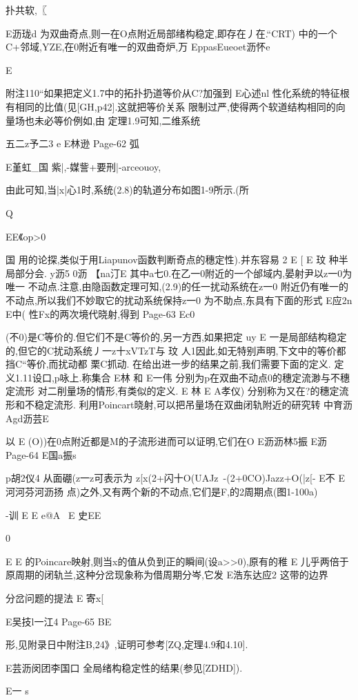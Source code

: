 {扑共软,〖

E沥珑d
为双曲奇点,则一在O点附近局部绪构稳定,即存在丿在.“CRT)
中的一个C+邻域,YZE,在0附近有唯一的双曲奇炉,万
EppasEueoet沥怀e

E

附注110“如果把定义1.7中的拓扑扔道等价从C?加强到
E心述nl
性化系统的特征根有相同的比值(见[GH,p42].这就把等价关系
限制过严,使得两个软道结构相同的向量场也未必等价例如,由
定理1.9可知,二维系统

五二z予二3
e
E林逊
Page-62
弧

E堇虹_国
紫|,-媒訾+要刑|-arceouoy,

由此可知,当|x|心1时,系统(2.8)的轨道分布如图1-9所示.(所

Q

EE《op>0

国
用的论探,类似于用Liapunov函数判断奇点的穗定性).并东容易
2
E
[
E
玟
种半局部分会.
y沥5
0沥
【na汀E
其中a七0.在乙一0附近的一个邰域内,晏射尹以z一0为唯一
不动点.注意,由隐函数定理可知,(2.9)的任一扰动系统在z一0
附近仍有唯一的不动点,所以我们不妙取它的扰动系统保持z一0
为不助点,东具有下面的形式
E应2n
E中(
性Fx的两次境代晓射,得到
Page-63
Ec0

(不0)是C等价的.但它们不是C等价的,另一方西,如果把定
uy
E
一是局部结构稳定的,但它的C扰动系统丿一z十xVTzT与
玟
人1因此,如无特别声明,下文中的等价都挡C“等价,而扰动都
栗C抓动.
在给出进一步的结果之前,我们需要下面的定义.
定义1.11设口,p咏上.称集合
E林
和
E一伟
分别为p在双曲不动点0的穗定流渺与不穗定流形
对二削量场的情形,有类似的定义.
E
林
E
A孝仪)
分别称为又在?的穗定流形和不稳定流形.
利用Poincart晓射,可以把吊量场在双曲闭轨附近的研究转
中育沥
Agd沥芸E

以
E
(O))在0点附近都是M的子流形进而可以证明,它们在O
E沥沥林5振
E沥
Page-64
E国a振s

p胡2仪4
从面硼(z一z可表示为
z[x(2+闪十O(UAJz~-(2+0CO)Jazz+O(|z[-
E不
E河河芬河沥扬
点)之外,又有两个新的不动点,它们是F,的2周期点(图1-100a)

-训
E
E
e@A
\
E
史EE

0

E
E
的Poincare映射,则当x的值从负到正的瞬间(设a>>0),原有的稚
E
儿乎两倍于原周期的闭轨兰,这种分岔现象称为借周期分岑,它发
E浩东达应2
这带的边界

分岔问题的提法
E
寄x[

E吴技l一江4
Page-65
BE

形,见附录日中附注B,24》,证明可参考[ZQ,定理4.9和4.10].

E芸沥闵团李国口
全局绪构稳定性的结果(参见[ZDHD]).

E一
s

}
